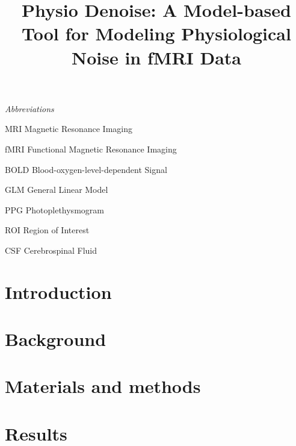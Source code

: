\documentclass[conference]{IEEEtran}
\newcommand{\abbrlabel}[1]{\makebox[2cm][l]{\textbf{#1}\ \dotfill}}
\newenvironment{abbreviations}{\begin{list}{}{\renewcommand{\makelabel}{\abbrlabel}}}{\end{list}}
\begin{document}
\title{Physio Denoise: A Model-based Tool for Modeling Physiological Noise in fMRI Data\\}

\author{}

\maketitle

%


\textit{Abbreviations}
\begin{abbreviations}
\item[MRI] Magnetic Resonance Imaging
\item[fMRI] Functional Magnetic Resonance Imaging
\item[BOLD] Blood-oxygen-level-dependent Signal  
\item[GLM] General Linear Model
\item[PPG] Photoplethysmogram 
\item[ROI] Region of Interest
\item[CSF] Cerebrospinal Fluid

\end{abbreviations}

\section{Introduction}\label{sec:Introduction}


\section{Background}\label{sec:Background}


\section{Materials and methods}\label{sec:Methods}


\section{Results}\label{sec:Results_And_Discussion}

\end{document}
